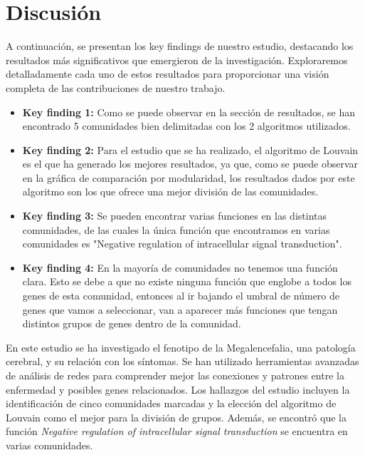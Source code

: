 \section{Discusión}


A continuación, se presentan los key findings de nuestro estudio, destacando los resultados más significativos que emergieron de la investigación. Exploraremos detalladamente cada uno de estos resultados para proporcionar una visión completa de las contribuciones de nuestro trabajo.

\begin{itemize}
	\item \textbf{Key finding 1: } Como se puede observar en la sección de resultados, se han encontrado 5 comunidades bien delimitadas con los 2 algoritmos utilizados.
	\item \textbf{Key finding 2: } Para el estudio que se ha realizado, el algoritmo de Louvain es el que ha generado los mejores resultados, ya que, como se puede observar en la gráfica de comparación por modularidad, los resultados dados por este algoritmo son los que ofrece una mejor división de las comunidades.
	\item \textbf{Key finding 3: } Se pueden encontrar varias funciones en las distintas comunidades, de las cuales la única función que encontramos en varias comunidades es "Negative regulation of intracellular signal transduction".
	\item \textbf{Key finding 4: } En la mayoría de comunidades no tenemos una función clara. Esto se debe a que no existe ninguna función que englobe a todos los genes de esta comunidad, entonces al ir bajando el umbral de número de genes que vamos a seleccionar, van a aparecer más funciones que tengan distintos grupos de genes dentro de la comunidad.
	
\end{itemize}


En este estudio se ha investigado el fenotipo de la Megalencefalia, una patología cerebral, y su relación con los síntomas. Se han utilizado herramientas avanzadas de análisis de redes para comprender mejor las conexiones y patrones entre la enfermedad y posibles genes relacionados. Los hallazgos del estudio incluyen la identificación de cinco comunidades marcadas y la elección del algoritmo de Louvain como el mejor para la división de grupos. Además, se encontró que la función \textit{Negative regulation of intracellular signal transduction} se encuentra en varias comunidades.

